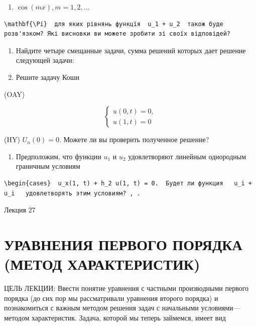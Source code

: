 \documentclass[
  ukrainian,
]{article}
\providecommand{\tightlist}{%
  \setlength{\itemsep}{0pt}\setlength{\parskip}{0pt}}
\begin{document}
\begin{enumerate}
\def\labelenumi{\arabic{enumi}.}
\setcounter{enumi}{4}
\tightlist
\item
  \(\cos(mx), m=1, 2, \dots\)
\end{enumerate}

\begin{verbatim}
\mathbf{\Pi}  для яких рівнянь функція  u_1 + u_2  також буде розв'язком? Які висновки ви можете зробити зі своїх відповідей?
\end{verbatim}

\begin{enumerate}
\def\labelenumi{\arabic{enumi}.}
\setcounter{enumi}{3}
\item
  Найдите четыре смещанные задачи, сумма решений которых дает решение
  следующей задачи:
\item
  Решите задачу Коши
\end{enumerate}

(OAY)

\[
\begin{cases} u(0, t) = 0, \\ u(1, t) = 0 \end{cases}
\]

(HY) \(U_n(0) = 0.\) Можете ли вы проверить полученное решение?

\begin{enumerate}
\def\labelenumi{\arabic{enumi}.}
\setcounter{enumi}{5}
\tightlist
\item
  Предположим, что функции \(u_1\) и \(u_2\) удовлетворяют линейным
  однородным граничным условиям
\end{enumerate}

\begin{verbatim}
\begin{cases}  u_x(1, t) + h_2 u(1, t) = 0.  Будет ли функция   u_i + u_i   удовлетворять этим условиям? , .
\end{verbatim}

Лекция 27

\section{УРАВНЕНИЯ ПЕРВОГО ПОРЯДКА (МЕТОД
ХАРАКТЕРИСТИК)}\label{ux443ux440ux430ux432ux43dux435ux43dux438ux44f-ux43fux435ux440ux432ux43eux433ux43e-ux43fux43eux440ux44fux434ux43aux430-ux43cux435ux442ux43eux434-ux445ux430ux440ux430ux43aux442ux435ux440ux438ux441ux442ux438ux43a}

ЦЕЛЬ ЛЕКЦИИ: Ввести понятие уравнения с частными производными первого
порядка (до сих пор мы рассматривали уравнения второго порядка) и
познакомиться с важным методом решения задач с начальными
условиями---методом характеристик. Задача, которой мы теперь займемся,
имеет вид
\end{document}
